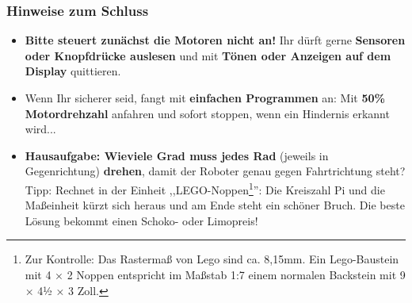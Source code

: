 \documentclass{beamer}
\begin{document}
\begin{frame}
\frametitle{Hinweise zum Schluss}
\begin{itemize}
\item
\textbf{Bitte steuert zunächst die Motoren nicht an!} Ihr dürft gerne \textbf{Sensoren oder Knopfdrücke auslesen} und mit \textbf{Tönen oder Anzeigen auf dem Display}  quittieren.
\item Wenn Ihr sicherer seid, fangt mit \textbf{einfachen Programmen} an: Mit \textbf{50\% Motordrehzahl} anfahren und sofort stoppen, wenn ein Hindernis erkannt wird...
\item \textbf{Hausaufgabe: Wieviele Grad muss jedes Rad} (jeweils in Gegenrichtung) \textbf{drehen}, damit der Roboter genau gegen Fahrtrichtung steht? Tipp: Rechnet in der Einheit ,,LEGO-Noppen\footnote{Zur Kontrolle: Das Rastermaß von Lego sind ca. 8,15mm. Ein Lego-Baustein mit 4 × 2 Noppen entspricht im Maßstab 1:7 einem normalen Backstein mit 9 × 4½ × 3 Zoll.}'': Die Kreiszahl Pi und die Maßeinheit kürzt sich heraus und am Ende steht ein schöner Bruch. Die beste Lösung bekommt einen Schoko- oder Limopreis!
\end{itemize}
\end{frame}

\end{document}
